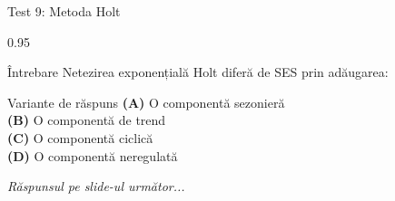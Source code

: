 \documentclass[9pt, aspectratio=169, t]{beamer}
\begin{document}
\begin{frame}{Test 9: Metoda Holt}
    \begin{cminipage}{0.95\textwidth}
    \begin{alertblock}{Întrebare}
        Netezirea exponențială Holt diferă de SES prin adăugarea:
    \end{alertblock}

    \vspace{0.4cm}

    \begin{block}{Variante de răspuns}
    \textcolor{MainBlue}{\textbf{(A)}} O componentă sezonieră\\[3pt]
    \textcolor{MainBlue}{\textbf{(B)}} O componentă de trend\\[3pt]
    \textcolor{MainBlue}{\textbf{(C)}} O componentă ciclică\\[3pt]
    \textcolor{MainBlue}{\textbf{(D)}} O componentă neregulată
    \end{block}
    \vspace{0.5cm}

    \begin{center}
        \textit{Răspunsul pe slide-ul următor...}
    \end{center}
    \end{cminipage}
\end{frame}
\end{document}
